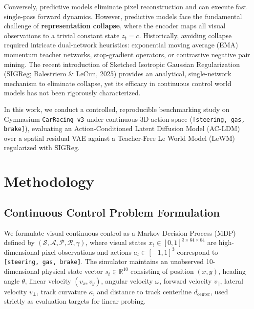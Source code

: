 \documentclass{article}
\begin{document}
Conversely, predictive models eliminate pixel reconstruction and can execute fast single-pass forward dynamics. However, predictive models face the fundamental challenge of \textbf{representation collapse}, where the encoder maps all visual observations to a trivial constant state $z_t = c$. Historically, avoiding collapse required intricate dual-network heuristics: exponential moving average (EMA) momentum teacher networks, stop-gradient operators, or contrastive negative pair mining. The recent introduction of Sketched Isotropic Gaussian Regularization (SIGReg; Balestriero \& LeCun, 2025) provides an analytical, single-network mechanism to eliminate collapse, yet its efficacy in continuous control world models has not been rigorously characterized.

In this work, we conduct a controlled, reproducible benchmarking study on Gymnasium \texttt{CarRacing-v3} under continuous 3D action space (\texttt{[steering, gas, brake]}), evaluating an Action-Conditioned Latent Diffusion Model (AC-LDM) over a spatial residual VAE against a Teacher-Free Le World Model (LeWM) regularized with SIGReg.

\section{Methodology}

\subsection{Continuous Control Problem Formulation}
We formulate visual continuous control as a Markov Decision Process (MDP) defined by $(\mathcal{S}, \mathcal{A}, \mathcal{P}, \mathcal{R}, \gamma)$, where visual states $x_t \in [0, 1]^{3 \times 64 \times 64}$ are high-dimensional pixel observations and actions $a_t \in [-1, 1]^3$ correspond to \texttt{[steering, gas, brake]}. The simulator maintains an unobserved 10-dimensional physical state vector $s_t \in \mathbb{R}^{10}$ consisting of position $(x, y)$, heading angle $\theta$, linear velocity $(v_x, v_y)$, angular velocity $\omega$, forward velocity $v_{\parallel}$, lateral velocity $v_{\perp}$, track curvature $\kappa$, and distance to track centerline $d_{\text{center}}$, used strictly as evaluation targets for linear probing.
\end{document}
